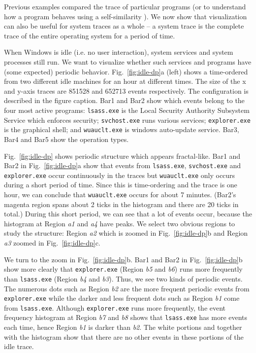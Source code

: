 Previous examples compared the trace of particular programs
(or to understand
how a program behaves using a self-similarity \VDP{}).
We now show that visualization can also be useful for system traces
as a whole -- a system trace is the complete trace of the entire operating
system for a period of time.


When Windows is idle (i.e. no user interaction), 
system services and system processes still run.
We want to visualize whether such services and programs have 
(some expected) periodic behavior.
Fig.~\ref{fig:idle-dp}a (left) shows a time-ordered \VDP{} from two 
different idle machines for an hour at different times.
The size of the x and y-axis traces are 
851528 and 652713 events respectively.
The configuration is described in the figure caption.
Bar1 and Bar2 show which events belong to
the four most active programs:
{\tt lsass.exe} is the Local Security Authority Subsystem Service which
enforces security;
{\tt svchost.exe} runs various services;
{\tt explorer.exe} is the graphical shell;
and {\tt wuauclt.exe} is windows auto-update service.
Bar3, Bar4 and Bar5 show the operation types.

Fig.~\ref{fig:idle-dp} shows periodic structure which appears
fractal-like.
Bar1 and Bar2 in Fig.~\ref{fig:idle-dp}a
show that events from {\tt lsass.exe}, {\tt svchost.exe} and {\tt explorer.exe}
occur continuously in the traces but {\tt wuauclt.exe} only occurs
during a short period of time.
Since this is time-ordering and the trace is one hour, we can conclude that
{\tt wuauclt.exe} occurs for about 7 minutes. (Bar2's magenta region
spans about 2
ticks in the histogram and there are 20 ticks in total.)
During this short period, we can see that a lot of events occur,
because the histogram at Region {\em a1} and {\em a4} have peaks.
We select two obvious regions to study the structure:
Region {\em a2} which is zoomed in Fig.~\ref{fig:idle-dp}b and 
Region {\em a3} zoomed in Fig.~\ref{fig:idle-dp}c.

We turn to the zoom in Fig.~\ref{fig:idle-dp}b.
Bar1 and Bar2 in
Fig.~\ref{fig:idle-dp}b show more clearly that
{\tt explorer.exe} (Region {\em b5} and {\em b6}) runs
more frequently than {\tt lsass.exe} (Region {\em b4} and {\em b3}).
Thus, we see two kinds of periodic events. The numerous dots such
as Region {\em b2} are the more frequent periodic events from 
{\tt explorer.exe} while the darker and less frequent dots such as
Region {\em b1} come from {\tt lsass.exe}.
Although {\tt explorer.exe} runs more frequently,
the event frequency histogram at Region {\em b7} and {\em b8} shows
that {\tt lsass.exe} has more events each time, hence Region {\em b1}
is darker than {\em b2}.
The white portions and together with the histogram show that there
are no other events in these portions of the idle trace.


